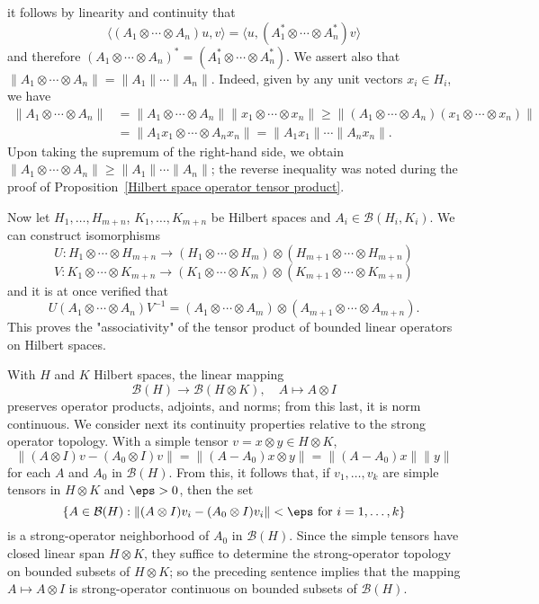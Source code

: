 it follows by linearity and continuity that
\[\langle(A_1\otimes\cdots\otimes A_n)u,v\rangle=\langle u,(A_1^*\otimes\cdots\otimes A_n^*)v\rangle\]
and therefore $(A_1\otimes\cdots\otimes A_n)^*=(A_1^*\otimes\cdots\otimes A_n^*)$. We assert also that $\|A_1\otimes\cdots\otimes A_n\|=\|A_1\|\cdots\|A_n\|$. Indeed, given by any unit vectors $x_i\in H_i$, we have
\begin{align*}
\|A_1\otimes\cdots\otimes A_n\|&=\|A_1\otimes\cdots\otimes A_n\|\|x_1\otimes\cdots\otimes x_n\|\geq\|(A_1\otimes\cdots\otimes A_n)(x_1\otimes\cdots\otimes x_n)\|\\
&=\|A_1x_1\otimes\cdots\otimes A_nx_n\|=\|A_1x_1\|\cdots\|A_nx_n\|.
\end{align*}
Upon taking the supremum of the right-hand side, we obtain $\|A_1\otimes\cdots\otimes A_n\|\geq\|A_1\|\cdots\|A_n\|$; the reverse inequality was noted during the proof of Proposition~\ref{Hilbert space operator tensor product}.\par
Now let $H_1,\dots,H_{m+n}$, $K_1,\dots,K_{m+n}$ be Hilbert spaces and $A_i\in\mathcal{B}(H_i,K_i)$. We can construct isomorphisms
\[U:H_1\otimes\cdots\otimes H_{m+n}\to(H_1\otimes\cdots\otimes H_{m})\otimes(H_{m+1}\otimes\cdots\otimes H_{m+n})\]
\[V:K_1\otimes\cdots\otimes K_{m+n}\to(K_1\otimes\cdots\otimes K_{m})\otimes(K_{m+1}\otimes\cdots\otimes K_{m+n})\]
and it is at once verified that
\[U(A_1\otimes\cdots\otimes A_n)V^{-1}=(A_1\otimes\cdots\otimes A_m)\otimes(A_{m+1}\otimes\cdots\otimes A_{m+n}).\]
This proves the "associativity" of the tensor product of bounded linear operators on Hilbert spaces.\par
With $H$ and $K$ Hilbert spaces, the linear mapping
\[\mathcal{B}(H)\to\mathcal{B}(H\otimes K),\quad A\mapsto A\otimes I\]
preserves operator products, adjoints, and norms; from this last, it is norm continuous. We consider next its continuity properties relative to the strong operator topology. With a simple tensor $v=x\otimes y\in H\otimes K$,
\[\|(A\otimes I)v-(A_0\otimes I)v\|=\|(A-A_0)x\otimes y\|=\|(A-A_0)x\|\|y\|\]
for each $A$ and $A_0$ in $\mathcal{B}(H)$. From this, it follows that, if $v_1,\dots,v_k$ are simple tensors in $H\otimes K$ and $\eps>0$, then the set
\[\{A\in\mathcal{B}(H):\|(A\otimes I)v_i-(A_0\otimes I)v_i\|<\eps\text{ for $i=1,\dots,k$}\}\]
is a strong-operator neighborhood of $A_0$ in $\mathcal{B}(H)$. Since the simple tensors have closed linear span $H\otimes K$, they suffice to determine the strong-operator topology on bounded subsets of $H\otimes K$; so the preceding sentence implies that the mapping $A\mapsto A\otimes I$ is strong-operator continuous on bounded subsets of $\mathcal{B}(H)$.
